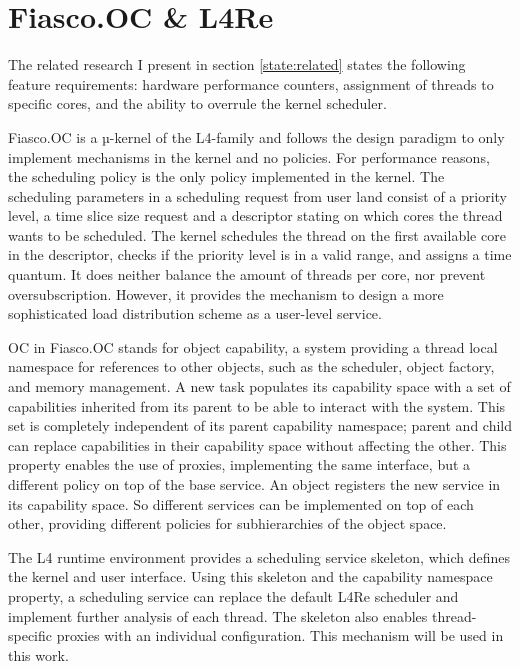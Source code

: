 \section{Fiasco.OC \& L4Re}
\label{state:env}
The related research I present in section \ref{state:related} states the
following feature requirements:
hardware performance counters, assignment of threads to specific
cores, and the ability to overrule the kernel scheduler.

Fiasco.OC is a µ-kernel of the L4-family and follows the design paradigm to
only implement mechanisms in the kernel and no policies.
For performance reasons, the scheduling policy is the only policy implemented in
the kernel.
The scheduling parameters in a scheduling request from user land consist of
a priority level, a time slice size request and a descriptor stating on which
cores the thread wants to be scheduled.
The kernel schedules the thread on the first available core in the descriptor,
checks if the priority level is in a valid range, and assigns a time
quantum.
It does neither balance the amount of threads per core, nor prevent
oversubscription.
However, it provides the mechanism to design a more sophisticated load
distribution scheme as a user-level service.

OC in Fiasco.OC stands for object capability, a system providing a thread local
namespace for references to other objects, such as the scheduler, object
factory, and memory management.
A new task populates its capability space with a set of capabilities inherited
from its parent to be able to interact with the system.
This set is completely independent of its parent capability namespace; parent
and child can replace capabilities in their capability space without affecting
the other.
This property enables the use of proxies, implementing the same interface, but
a different policy on top of the base service.
An object registers the new service in its capability space.
So different services can be implemented on top of each other, providing
different policies for subhierarchies of the object space.


The L4 runtime environment provides a scheduling service skeleton, which
defines the kernel and user interface.
Using this skeleton and the capability namespace property, a scheduling service
can replace the default L4Re scheduler and implement further analysis of each
thread.
The skeleton also enables thread-specific proxies with an individual
configuration.
This mechanism will be used in this work.
\\

